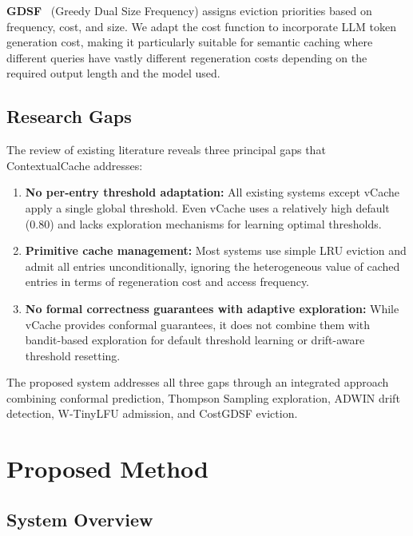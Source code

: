 \documentclass[conference]{IEEEtran}
\begin{document}
\textbf{GDSF}~\cite{young2000} (Greedy Dual Size Frequency) assigns eviction priorities based on frequency, cost, and size. We adapt the cost function to incorporate LLM token generation cost, making it particularly suitable for semantic caching where different queries have vastly different regeneration costs depending on the required output length and the model used.

\subsection{Research Gaps}

The review of existing literature reveals three principal gaps that ContextualCache addresses:

\begin{enumerate}[leftmargin=*]
\item \textbf{No per-entry threshold adaptation:} All existing systems except vCache apply a single global threshold. Even vCache uses a relatively high default (0.80) and lacks exploration mechanisms for learning optimal thresholds.

\item \textbf{Primitive cache management:} Most systems use simple LRU eviction and admit all entries unconditionally, ignoring the heterogeneous value of cached entries in terms of regeneration cost and access frequency.

\item \textbf{No formal correctness guarantees with adaptive exploration:} While vCache provides conformal guarantees, it does not combine them with bandit-based exploration for default threshold learning or drift-aware threshold resetting.
\end{enumerate}

The proposed system addresses all three gaps through an integrated approach combining conformal prediction, Thompson Sampling exploration, ADWIN drift detection, W-TinyLFU admission, and CostGDSF eviction.

\section{Proposed Method}

\subsection{System Overview}
\end{document}
